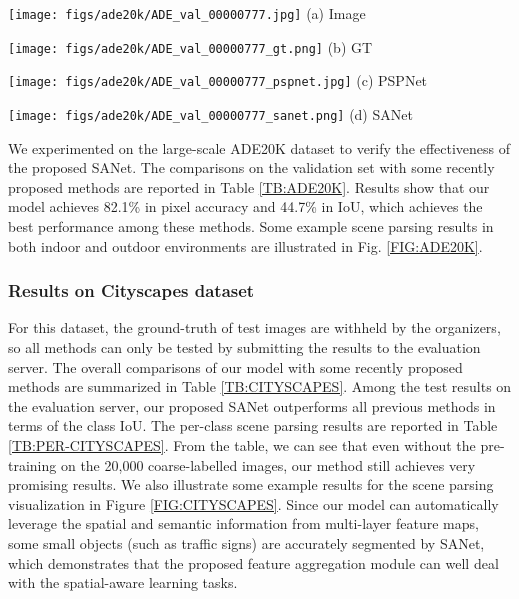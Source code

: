 \documentclass[10pt,twocolumn,twoside]{IEEEtran}
\begin{document}
\begin{figure*}[t]
\begin{minipage}{0.2\textwidth}\centering
	\texttt{[image: figs/ade20k/ADE\_val\_00000777.jpg]}
(a) Image 
\end{minipage}	
\begin{minipage}{0.2\textwidth}\centering	
	\texttt{[image: figs/ade20k/ADE\_val\_00000777\_gt.png]}
(b) GT 
\end{minipage}
\begin{minipage}{0.2\textwidth}\centering	
	\texttt{[image: figs/ade20k/ADE\_val\_00000777\_pspnet.jpg]} 
(c) PSPNet
\end{minipage}
\begin{minipage}{0.2\textwidth}\centering	
	\texttt{[image: figs/ade20k/ADE\_val\_00000777\_sanet.png]}
(d) SANet 
\end{minipage}	
\caption{Scene parsing examples on ADE20K validation set.}
\label{FIG:ADE20K}
\end{figure*}

We experimented on the large-scale ADE20K dataset to verify the effectiveness of the proposed SANet. The comparisons on the validation set with some recently proposed methods are reported in Table \ref{TB:ADE20K}. Results show that our model achieves 82.1\% in pixel accuracy and 44.7\% in IoU, which achieves the best performance among these methods. Some example scene parsing results in both indoor and outdoor environments are illustrated in Fig. \ref{FIG:ADE20K}. 



\subsubsection{Results on Cityscapes dataset}

For this dataset, the ground-truth of test images are withheld by the organizers, so all methods can only be tested by submitting the results to the evaluation server. The overall comparisons of our model with some recently proposed methods are summarized in Table \ref{TB:CITYSCAPES}. Among the test results on the evaluation server, our proposed SANet outperforms all previous methods in terms of the class IoU. The per-class scene parsing results are reported in Table \ref{TB:PER-CITYSCAPES}. From the table, we can see that even without the pre-training on the 20,000 coarse-labelled images, our method still achieves very promising results. We also illustrate some example results for the scene parsing visualization in Figure \ref{FIG:CITYSCAPES}. Since our model can automatically leverage the spatial and semantic information from multi-layer feature maps, some small objects (such as traffic signs) are accurately segmented by SANet, which demonstrates that the proposed feature aggregation module can well deal with the spatial-aware learning tasks.  
\end{document}
